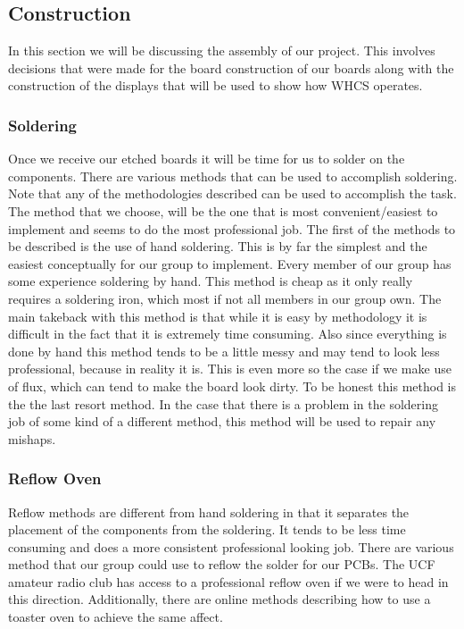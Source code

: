\subsection{Construction}
In this section we will be discussing the assembly of our project. This
involves decisions that were made for the board construction of our boards
along with the construction of the displays that will be used to show how WHCS
operates.

\subsubsection{Soldering}
Once we receive our etched boards it will be time for us to solder on the
components. There are various methods that can be used to accomplish soldering.
Note that any of the methodologies described can be used to accomplish the
task. The method that we choose, will be the one that is most
convenient/easiest to implement and seems to do the most professional job. The
first of the methods to be described is the use of hand soldering. This is by
far the simplest and the easiest conceptually for our group to implement. Every
member of our group has some experience soldering by hand. This method is cheap
as it only really requires a soldering iron, which most if not all members in
our group own.  The main takeback with this method is that while it is easy by
methodology it is difficult in the fact that it is extremely time consuming.
Also since everything is done by hand this method tends to be a little messy
and may tend to look less professional, because in reality it is. This is even
more so the case if we make use of flux, which can tend to make the board look
dirty. To be honest this method is the the last resort method. In the case that
there is a problem in the soldering job of some kind of a different method,
this method will be used to repair any mishaps.

\subsubsection{Reflow Oven}
Reflow methods are different from hand soldering in that it separates the
placement of the components from the soldering. It tends to be less time
consuming and does a more consistent professional looking job. There are
various method that our group could use to reflow the solder for our PCBs. The
UCF amateur radio club has access to a professional reflow oven if we were to
head in this direction. Additionally, there are online methods describing how
to use a toaster oven to achieve the same affect.

